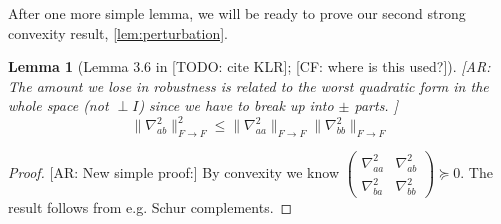 \documentclass{article}
\newtheorem{lemma}[theorem]{Lemma}
\newcommand\tr{\operatorname{Tr}}
\newcommand{\CF}[1]{{\color{purple}[CF: #1]}}
\newcommand{\AR}[1]{{\color{orange}[AR: #1]}}
\newcommand{\TODO}[1]{{\color{blue}[TODO: #1]}}
\begin{document}
After one more simple lemma, we will be ready to prove our second strong convexity result, \cref{lem:perturbation}.
\begin{lemma} [Lemma 3.6 in \TODO{cite KLR}; \CF{where is this used?}]
\AR{The amount we lose in robustness is related to the worst quadratic form in the whole space (not $\perp I$) since we have to break up into $\pm$ parts. }
\[ \|\nabla_{ab}^{2}\|_{F \to F}^{2} \leq \|\nabla_{aa}^{2}\|_{F \to F} \|\nabla_{bb}^{2}\|_{F \to F}   \]
\end{lemma}
\begin{proof}
\AR{New simple proof:} By convexity we know $\begin{pmatrix} \nabla_{aa}^{2} & \nabla_{ab}^{2} \\ \nabla_{ba}^{2} & \nabla_{bb}^{2}  \end{pmatrix} \succeq 0$. The result follows from e.g. Schur complements. 
\end{proof}









\end{document}

